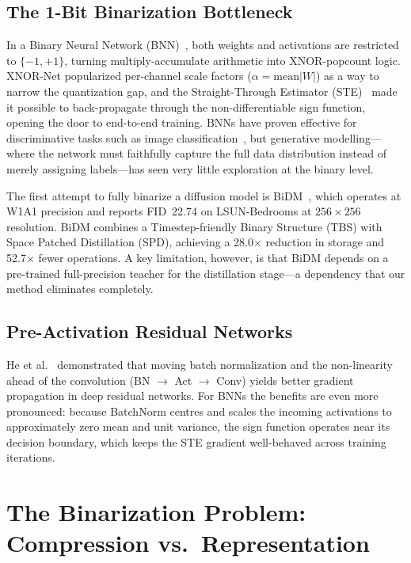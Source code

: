 \documentclass[twocolumn, journal]{IEEEtran}
\begin{document}
\subsection{The 1-Bit Binarization Bottleneck}

In a Binary Neural Network
(BNN)~\cite{hubara2016bnn,rastegari2016xnornet}, both weights and activations are
restricted to $\{-1,+1\}$, turning multiply-accumulate arithmetic into XNOR-popcount
logic. XNOR-Net popularized per-channel scale factors
($\alpha = \text{mean}|W|$) as a way to narrow the quantization gap, and the
Straight-Through Estimator (STE)~\cite{bengio2013ste} made it possible to back-propagate
through the non-differentiable sign function, opening the door to end-to-end training.
BNNs have proven effective for discriminative tasks such as image
classification~\cite{liu2020reactnet,martinez2020training}, but generative
modelling---where the network must faithfully capture the full data distribution instead
of merely assigning labels---has seen very little exploration at the binary level.

The first attempt to fully binarize a diffusion model is
BiDM~\cite{bidm2024}, which operates at W1A1 precision and reports FID~22.74 on
LSUN-Bedrooms at $256{\times}256$ resolution. BiDM combines a Timestep-friendly Binary
Structure (TBS) with Space Patched Distillation (SPD), achieving a 28.0$\times$
reduction in storage and 52.7$\times$ fewer operations. A key limitation, however, is
that BiDM depends on a pre-trained full-precision teacher for the distillation
stage---a dependency that our method eliminates completely.

\subsection{Pre-Activation Residual Networks}

He et al.~\cite{he2016preact} demonstrated that moving batch normalization and the
non-linearity ahead of the convolution (BN $\to$ Act $\to$ Conv) yields better gradient
propagation in deep residual networks. For BNNs the benefits are even more pronounced:
because BatchNorm centres and scales the incoming activations to approximately zero mean
and unit variance, the sign function operates near its decision boundary, which keeps
the STE gradient well-behaved across training iterations.

\section{The Binarization Problem: Compression vs.\ Representation}
\end{document}
